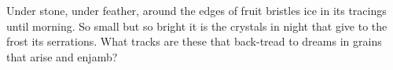 Under stone, under feather, around the edges of fruit bristles ice in
its tracings until morning. So small but so bright it is the crystals in night
that give to the frost its serrations. What tracks are these that back-tread to
dreams in grains that arise and enjamb?
